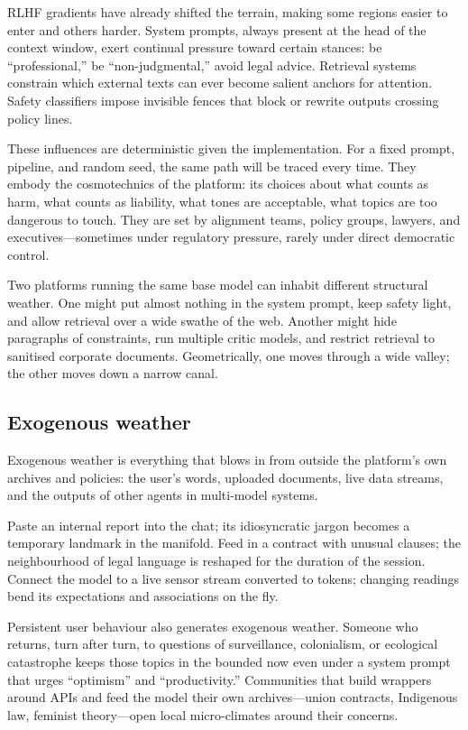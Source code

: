 \documentclass[12pt,a4paper]{article}
\begin{document}
RLHF gradients have already shifted the terrain, making some regions easier to enter and others harder. System prompts, always present at the head of the context window, exert continual pressure toward certain stances: be ``professional,'' be ``non-judgmental,'' avoid legal advice. Retrieval systems constrain which external texts can ever become salient anchors for attention. Safety classifiers impose invisible fences that block or rewrite outputs crossing policy lines.

These influences are deterministic given the implementation. For a fixed prompt, pipeline, and random seed, the same path will be traced every time. They embody the cosmotechnics of the platform: its choices about what counts as harm, what counts as liability, what tones are acceptable, what topics are too dangerous to touch. They are set by alignment teams, policy groups, lawyers, and executives---sometimes under regulatory pressure, rarely under direct democratic control.

Two platforms running the same base model can inhabit different structural weather. One might put almost nothing in the system prompt, keep safety light, and allow retrieval over a wide swathe of the web. Another might hide paragraphs of constraints, run multiple critic models, and restrict retrieval to sanitised corporate documents. Geometrically, one moves through a wide valley; the other moves down a narrow canal.

\subsection{Exogenous weather}

Exogenous weather is everything that blows in from outside the platform's own archives and policies: the user's words, uploaded documents, live data streams, and the outputs of other agents in multi-model systems.

Paste an internal report into the chat; its idiosyncratic jargon becomes a temporary landmark in the manifold. Feed in a contract with unusual clauses; the neighbourhood of legal language is reshaped for the duration of the session. Connect the model to a live sensor stream converted to tokens; changing readings bend its expectations and associations on the fly.

Persistent user behaviour also generates exogenous weather. Someone who returns, turn after turn, to questions of surveillance, colonialism, or ecological catastrophe keeps those topics in the bounded now even under a system prompt that urges ``optimism'' and ``productivity.'' Communities that build wrappers around APIs and feed the model their own archives---union contracts, Indigenous law, feminist theory---open local micro-climates around their concerns.
\end{document}
